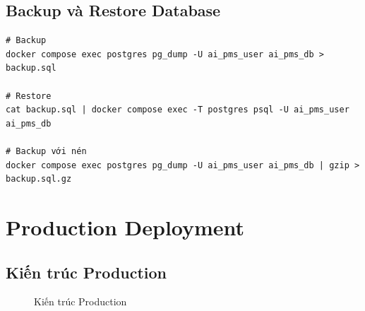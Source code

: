 \documentclass[12pt,a4paper]{report}
\begin{document}
\subsection{Backup và Restore Database}

\begin{verbatim}
# Backup
docker compose exec postgres pg_dump -U ai_pms_user ai_pms_db > backup.sql

# Restore
cat backup.sql | docker compose exec -T postgres psql -U ai_pms_user ai_pms_db

# Backup với nén
docker compose exec postgres pg_dump -U ai_pms_user ai_pms_db | gzip > backup.sql.gz
\end{verbatim}

\section{Production Deployment}

\subsection{Kiến trúc Production}

\begin{figure}[H]
\centering
{}
\caption{Kiến trúc Production}
\label{fig:production_architecture}
\end{figure}
\end{document}
